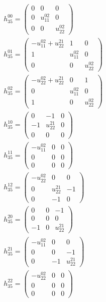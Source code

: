 \documentclass[a4paper, 11pt, twoside, onecolumn]{article}
\begin{document}
\begin{landscape}
\begin{gather*}
	 h_{35}^{00}=\begin{pmatrix}0 & 0 & 0\\0 & u^{02}_{11} & 0\\0 & 0 & u^{02}_{22}\end{pmatrix}\\ 
	 h_{35}^{01}=\begin{pmatrix}- u^{02}_{11} + u^{21}_{22} & 1 & 0\\1 & u^{02}_{11} & 0\\0 & 0 & u^{02}_{22}\end{pmatrix}\\ 
	 h_{35}^{02}=\begin{pmatrix}- u^{02}_{22} + u^{21}_{22} & 0 & 1\\0 & u^{02}_{11} & 0\\1 & 0 & u^{02}_{22}\end{pmatrix}\\ 
	 h_{35}^{10}=\begin{pmatrix}0 & -1 & 0\\-1 & u^{21}_{22} & 0\\0 & 0 & 0\end{pmatrix}\\ 
	 h_{35}^{11}=\begin{pmatrix}- u^{02}_{11} & 0 & 0\\0 & 0 & 0\\0 & 0 & 0\end{pmatrix}\\ 
	 h_{35}^{12}=\begin{pmatrix}- u^{02}_{22} & 0 & 0\\0 & u^{21}_{22} & -1\\0 & -1 & 0\end{pmatrix}\\ 
	 h_{35}^{20}=\begin{pmatrix}0 & 0 & -1\\0 & 0 & 0\\-1 & 0 & u^{21}_{22}\end{pmatrix}\\ 
	 h_{35}^{21}=\begin{pmatrix}- u^{02}_{11} & 0 & 0\\0 & 0 & -1\\0 & -1 & u^{21}_{22}\end{pmatrix}\\ 
	 h_{35}^{22}=\begin{pmatrix}- u^{02}_{22} & 0 & 0\\0 & 0 & 0\\0 & 0 & 0\end{pmatrix}\\ 

\end{gather*}
\end{landscape}
\end{document}
